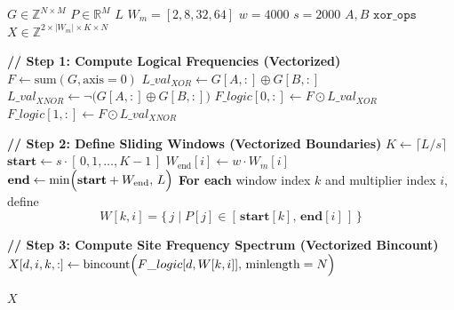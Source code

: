 \documentclass[9pt,twoside]{pnas-new} %
\makeatletter
\providecommand{\DIFdel}[1]{{\protect\color{red}\sout{#1}}} %
\providecommand{\DIFaddbegin}{} %
\providecommand{\DIFaddend}{} %
\providecommand{\DIFdelbegin}{} %
\providecommand{\DIFdelend}{} %
\let\sout@orig\sout %
\renewcommand{\sout}[1]{\ifmmode\text{\sout@orig{\ensuremath{#1}}}\else\sout@orig{#1}\fi} %
\makeatother
\begin{document}
\DIFdelbegin %
\DIFdelend \DIFaddbegin \begin{algorithm}[H]
\DIFaddend \caption{ProcessGenotypeMatrixAndPositions (Vectorized)}\label{alg:vectorized}
\begin{algorithmic}[1]
\Require $G \in \mathbb{Z}^{N \times M}$ 
\Require $P \in \mathbb{R}^M$ 
\Require $L$ 
\Require $W_m = [2, 8, 32, 64]$ 
\Require $w = 4000$ 
\Require $s = 2000$ 
\Require $A, B$ 
\Require $\texttt{xor\_ops}$ 
\Ensure $X \in \mathbb{Z}^{2 \times |W_m| \times K \times N}$ 

\State \textbf{// Step 1: Compute Logical Frequencies (Vectorized)}
\State $F \gets \text{sum}(G,\text{axis}=0)$ 
\State $L\_val_{XOR} \gets G[A, :] \oplus G[B, :]$
\State $L\_val_{XNOR} \gets \neg\bigl(G[A, :] \oplus G[B, :]\bigr)$
\State \DIFdelbegin \DIFdel{\quad
}%
\DIFdelend $F\_logic[0, :] \gets F \odot L\_val_{XOR}$ 
\State $F\_logic[1, :] \gets F \odot L\_val_{XNOR}$ 
\DIFdelbegin %
\DIFdelend \DIFaddbegin \smallskip
\DIFaddend 

\State \textbf{// Step 2: Define Sliding Windows (Vectorized Boundaries)}
\State $K \gets \lceil L/s \rceil$
\State $\mathbf{start} \gets s \cdot [\,0,1,\ldots, K-1\,]$ 
    \State $W_{\text{end}}[i] \gets w \cdot W_m[i]$
\EndFor
\State $\mathbf{end} \gets \min\Bigl(\mathbf{start} + W_{\text{end}},\, L\Bigr)$ 
\State \DIFdelbegin \DIFdel{\quad
}%
\DIFdelend \textbf{For each} window index $k$ and multiplier index $i$, define
\[
W[k,i] = \{\, j \mid P[j] \in [\,\mathbf{start}[k],\, \mathbf{end}[i]\,] \,\}
\]

\State \textbf{// Step 3: Compute Site Frequency Spectrum (Vectorized Bincount)}
            \State $X[d,i,k,:] \gets \text{bincount}\Bigl(F\_logic[d, W[k,i]],\, \text{minlength}=N\Bigr)$
        \EndFor
    \EndFor
\EndFor
\DIFdelbegin %
\DIFdelend \DIFaddbegin \smallskip
\DIFaddend 

\State \Return $X$
\end{algorithmic}
\label{alg:alg1}
\end{algorithm}
\end{document}
